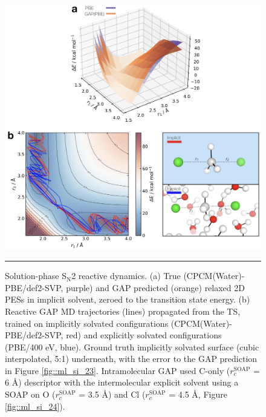 \documentclass[../../main.tex]{subfiles}
\begin{document}
\begin{figure}[h!]
	\vspace{0.4cm}
	\centering
	\includegraphics[width=14cm]{6/gap/figs_ms/fig7}
	\vspace{0.2cm}
	\hrule
	\caption{Solution-phase S${}_\text{N}$2 reactive dynamics. (a) True (CPCM(Water)-PBE/def2-SVP, purple) and GAP predicted (orange) relaxed 2D PESs in implicit solvent, zeroed to the transition state energy. (b) Reactive GAP MD trajectories (lines) propagated from the TS, trained on implicitly solvated configurations (CPCM(Water)-PBE/def2-SVP, red) and explicitly solvated configurations (PBE/400 eV, blue). Ground truth implicitly solvated surface (cubic interpolated, 5:1) underneath, with the error to the GAP prediction in Figure \ref{fig::ml_si_23}. Intramolecular GAP used C-only ($r_c^\text{SOAP}$ = 6 \AA) descriptor with the intermolecular explicit solvent using a SOAP on O ($r_c^\text{SOAP}$ = 3.5 \AA) and Cl ($r_c^\text{SOAP}$ = 4.5 \AA, Figure \ref{fig::ml_si_24}).}
	\label{fig::ml_7}
\end{figure}
\end{document}
